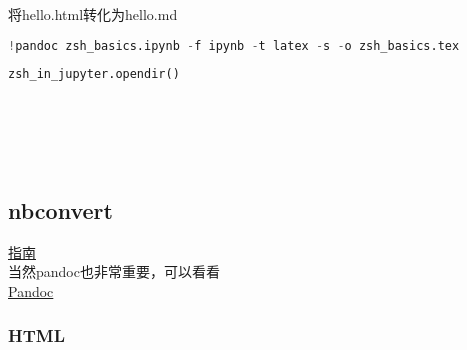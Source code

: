 \documentclass[
]{article}
\begin{document}
将hello.html转化为hello.md

\hypertarget{e9d92533}{}
\begin{lstlisting}[language=Python]
!pandoc zsh_basics.ipynb -f ipynb -t latex -s -o zsh_basics.tex
\end{lstlisting}

\hypertarget{9438b4d2}{}
\begin{lstlisting}[language=Python]
zsh_in_jupyter.opendir()
\end{lstlisting}

\hypertarget{d987b502}{}
\begin{lstlisting}[language=Python]
\end{lstlisting}

\hypertarget{4e375e7c}{}
\begin{lstlisting}[language=Python]
\end{lstlisting}

\hypertarget{e4783d59}{}
\begin{lstlisting}[language=Python]
\end{lstlisting}

\hypertarget{dddb2f3c}{}
\begin{lstlisting}[language=Python]
\end{lstlisting}

\hypertarget{42c916b6}{}
\begin{lstlisting}[language=Python]
\end{lstlisting}

\hypertarget{506a98c7}{}
\begin{lstlisting}[language=Python]
\end{lstlisting}

\hypertarget{54253909}{}
\hypertarget{nbconvert}{%
\subsection{nbconvert}\label{nbconvert}}

\leavevmode{}%
\href{https://nbconvert.readthedocs.io/en/latest/usage.html?highlight=pdf}{指南}\\
当然pandoc也非常重要，可以看看\\
\href{https://pandoc.org/}{Pandoc}

\hypertarget{d472e0de}{}
\hypertarget{html}{%
\subsubsection{HTML}\label{html}}
\end{document}
